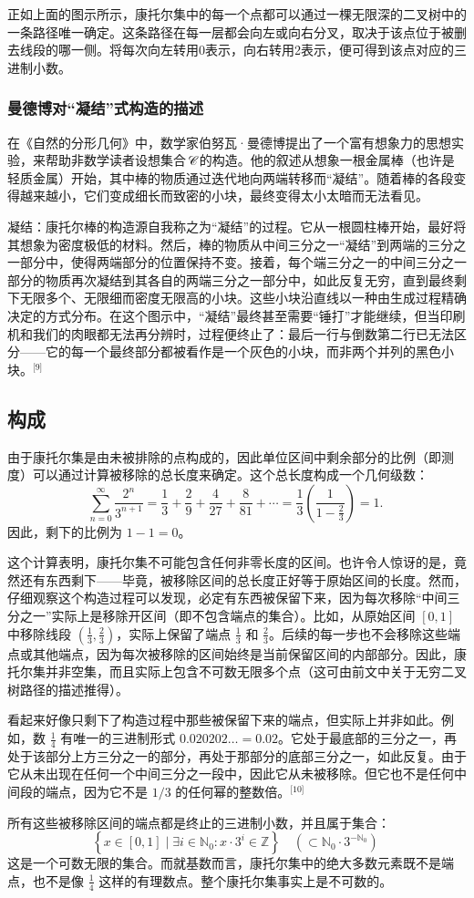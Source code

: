 正如上面的图示所示，康托尔集中的每一个点都可以通过一棵无限深的二叉树中的一条路径唯一确定。这条路径在每一层都会向左或向右分叉，取决于该点位于被删去线段的哪一侧。将每次向左转用0表示，向右转用2表示，便可得到该点对应的三进制小数。
\subsubsection{曼德博对“凝结”式构造的描述}
在《自然的分形几何》中，数学家伯努瓦·曼德博提出了一个富有想象力的思想实验，来帮助非数学读者设想集合 𝒞 的构造。他的叙述从想象一根金属棒（也许是轻质金属）开始，其中棒的物质通过迭代地向两端转移而“凝结”。随着棒的各段变得越来越小，它们变成细长而致密的小块，最终变得太小太暗而无法看见。

凝结：康托尔棒的构造源自我称之为“凝结”的过程。它从一根圆柱棒开始，最好将其想象为密度极低的材料。然后，棒的物质从中间三分之一“凝结”到两端的三分之一部分中，使得两端部分的位置保持不变。接着，每个端三分之一的中间三分之一部分的物质再次凝结到其各自的两端三分之一部分中，如此反复无穷，直到最终剩下无限多个、无限细而密度无限高的小块。这些小块沿直线以一种由生成过程精确决定的方式分布。在这个图示中，“凝结”最终甚至需要“锤打”才能继续，但当印刷机和我们的肉眼都无法再分辨时，过程便终止了：最后一行与倒数第二行已无法区分——它的每一个最终部分都被看作是一个灰色的小块，而非两个并列的黑色小块。\(^\text{[9]}\)
\subsection{构成}
由于康托尔集是由未被排除的点构成的，因此单位区间中剩余部分的比例（即测度）可以通过计算被移除的总长度来确定。这个总长度构成一个几何级数：
$$
\sum_{n=0}^{\infty} \frac{2^n}{3^{n+1}} = \frac{1}{3} + \frac{2}{9} + \frac{4}{27} + \frac{8}{81} + \cdots = \frac{1}{3} \left( \frac{1}{1 - \frac{2}{3}} \right) = 1.~
$$
因此，剩下的比例为 $1 - 1 = 0$。

这个计算表明，康托尔集不可能包含任何非零长度的区间。也许令人惊讶的是，竟然还有东西剩下——毕竟，被移除区间的总长度正好等于原始区间的长度。然而，仔细观察这个构造过程可以发现，必定有东西被保留下来，因为每次移除“中间三分之一”实际上是移除开区间（即不包含端点的集合）。比如，从原始区间 $[0, 1]$ 中移除线段 $(\frac{1}{3}, \frac{2}{3})$，实际上保留了端点 $\frac{1}{3}$ 和 $\frac{2}{3}$。后续的每一步也不会移除这些端点或其他端点，因为每次被移除的区间始终是当前保留区间的内部部分。因此，康托尔集并非空集，而且实际上包含不可数无限多个点（这可由前文中关于无穷二叉树路径的描述推得）。

看起来好像只剩下了构造过程中那些被保留下来的端点，但实际上并非如此。例如，数 $\frac{1}{4}$ 有唯一的三进制形式 $0.020202\ldots = 0.02$。它处于最底部的三分之一，再处于该部分上方三分之一的部分，再处于那部分的底部三分之一，如此反复。由于它从未出现在任何一个中间三分之一段中，因此它从未被移除。但它也不是任何中间段的端点，因为它不是 $1/3$ 的任何幂的整数倍。\(^\text{[10]}\)

所有这些被移除区间的端点都是终止的三进制小数，并且属于集合：
$$
\left\{ x \in [0,1] \mid \exists i \in \mathbb{N}_0: x \cdot 3^i \in \mathbb{Z} \right\} \quad \left( \subset \mathbb{N}_0 \cdot 3^{-\mathbb{N}_0} \right)~
$$
这是一个可数无限的集合。而就基数而言，康托尔集中的绝大多数元素既不是端点，也不是像 $\frac{1}{4}$ 这样的有理数点。整个康托尔集事实上是不可数的。

